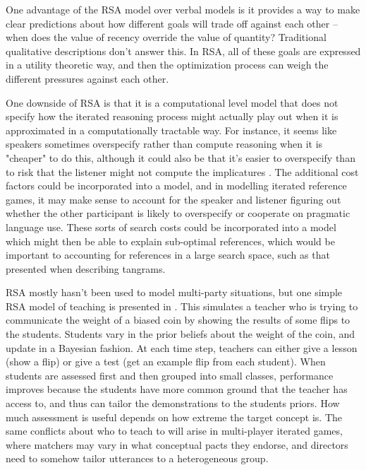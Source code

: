 \documentclass[11pt]{article}
\begin{document}
One advantage of the RSA model over verbal models is it provides a way to make clear predictions about how different goals will trade off against each other -- when does the value of recency override the value of quantity? Traditional qualitative descriptions don't answer this. In RSA, all of these goals are expressed in a utility theoretic way, and then the optimization process can weigh the different pressures against each other. 

One downside of RSA is that it is a computational level model that does not specify how the iterated reasoning process might actually play out when it is approximated in a computationally tractable way. For instance, it seems like speakers sometimes overspecify rather than compute reasoning when it is "cheaper" to do this, although it could also be that it's easier to overspecify than to risk that the listener might not compute the implicatures \cite{baumannOverspecificationCostPragmatic2014}. The additional cost factors could be incorporated into a model, and in modelling iterated reference games, it may make sense to account for the speaker and listener figuring out whether the other participant is likely to overspecify or cooperate on pragmatic language use.  These sorts of search costs could be incorporated into a model which might then be able to explain sub-optimal references, which would be important to accounting for references in a large search space, such as that presented when describing tangrams. 

RSA mostly hasn't been used to model multi-party situations, but one simple RSA model of teaching is presented in \cite{frankModelingClassroomTeaching2018}. This simulates a teacher who is trying to communicate the weight of a biased coin by showing the results of some flips to the students. Students vary in the prior beliefs about the weight of the coin, and update in a Bayesian fashion. At each time step, teachers can either give a lesson (show a flip) or give a test (get an example flip from each student). When students are assessed first and then grouped into small classes, performance improves because the students have more common ground that the teacher has access to, and thus can tailor the demonstrations to the students priors. How much assessment is useful depends on how extreme the target concept is. The same conflicts about who to teach to will arise in multi-player iterated games, where matchers may vary in what conceptual pacts they endorse, and directors need to somehow tailor utterances to a heterogeneous group. 
\end{document}
